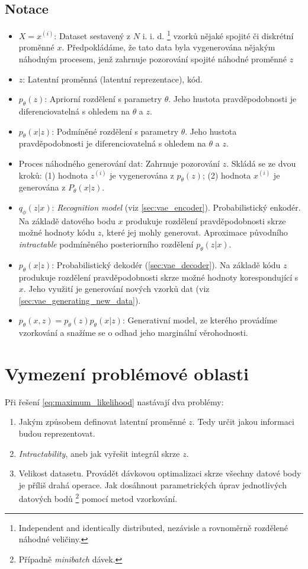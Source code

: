 \subsection{Notace}
\begin{itemize}
    \item $X = {x^{(i)}}$: Dataset sestavený z $N$ i. i. d. \footnote{Independent and identically distributed, nezávisle a rovnoměrně rozdělené náhodné veličiny.} vzorků nějaké spojité či diskrétní proměnné $x$. 
    Předpokládáme, že tato data byla vygenerována nějakým náhodným procesem, jenž zahrnuje pozorování spojité náhodné proměnné $z$
    \item $z$: Latentní proměnná (latentní reprezentace), kód.
    \item $p_\theta(z)$: Apriorní rozdělení s parametry $\theta$. Jeho hustota pravděpodobnosti je diferenciovatelná s ohledem na $\theta$ a $z$.
    \item $p_\theta(x|z)$: Podmíněné rozdělení s parametry $\theta$. Jeho hustota pravděpodobnosti je diferenciovatelná s ohledem na $\theta$ a $z$.
    \item Proces náhodného generování dat: Zahrnuje pozorování $z$. Skládá se ze dvou kroků: (1) hodnota $z^{(i)}$ je vygenerována z $p_\theta(z)$; (2) hodnota $x^{(i)}$ je generována z $P_\theta(x|z)$.
    \item $q_\phi(z|x)$: \emph{Recognition model} (viz \autoref{sec:vae_encoder}). Probabilistický enkodér. Na základě datového bodu $x$ produkuje rozdělení pravděpodobnosti skrze možné hodnoty kódu $z$, které jej mohly generovat. Aproximace původního \emph{intractable} podmíněného posteriorního rozdělení $p_\theta(z|x)$.
    \item $p_\theta(x|z)$: Probabilistický dekodér (\autoref{sec:vae_decoder}). Na základě kódu $z$ produkuje rozdělení pravděpodobnosti skrze možné hodnoty korespondující s $x$. Jeho využití je generování nových vzorků dat (viz \autoref{sec:vae_generating_new_data}).
    \item $p_\theta(x, z) = p_\theta(z) p_\theta(x|z)$: Generativní model, ze kterého provádíme vzorkování a snažíme se o odhad jeho marginální věrohodnosti.
\end{itemize}

\section{Vymezení problémové oblasti}
Při řešení \autoref{eq:maximum_likelihood} nastávají dva problémy:
\begin{enumerate}
    \item Jakým způsobem definovat latentní proměnné $z$. Tedy určit jakou informaci budou reprezentovat.
    \item \emph{Intractability}, aneb jak vyřešit integrál skrze $z$. \cite[Sekce 2.1.]{Kingma2014}
    \item Velikost datasetu. Provádět dávkovou optimalizaci skrze všechny datové body je příliš drahá operace. Jak dosáhnout parametrických úprav jednotlivých datových bodů \footnote{Případně \emph{minibatch} dávek.} pomocí metod vzorkování.
\end{enumerate}

